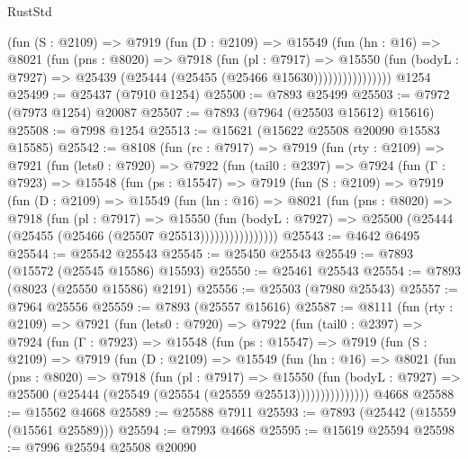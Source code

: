 \begin{lexlean}{RustStd}
\begin{coremodule}
                  (fun (S : @2109) =>
                  @7919
                    (fun (D : @2109) =>
                    @15549
                      (fun (hn : @16) =>
                      @8021
                        (fun (pns : @8020) =>
                        @7918
                          (fun (pl : @7917) =>
                          @15550
                            (fun (bodyL : @7927) =>
                            @25439 (@25444 (@25455 (@25466 @15630))))))))))))))))
    @1254
@25499 := @25437 (@7910 @1254)
@25500 := @7893 @25499
@25503 := @7972 (@7973 @1254) @20087
@25507 := @7893 (@7964 (@25503 @15612) @15616)
@25508 := @7998 @1254
@25513 := @15621 (@15622 @25508 @20090 @15583 @15585)
@25542 := @8108
    (fun (rc : @7917) =>
    @7919
      (fun (rty : @2109) =>
      @7921
        (fun (lets0 : @7920) =>
        @7922
          (fun (tail0 : @2397) =>
          @7924
            (fun (Γ : @7923) =>
            @15548
              (fun (ps : @15547) =>
              @7919
                (fun (S : @2109) =>
                @7919
                  (fun (D : @2109) =>
                  @15549
                    (fun (hn : @16) =>
                    @8021
                      (fun (pns : @8020) =>
                      @7918
                        (fun (pl : @7917) =>
                        @15550
                          (fun (bodyL : @7927) =>
                          @25500 (@25444 (@25455 (@25466 (@25507 @25513))))))))))))))))
@25543 := @4642 @6495
@25544 := @25542 @25543
@25545 := @25450 @25543
@25549 := @7893 (@15572 (@25545 @15586) @15593)
@25550 := @25461 @25543
@25554 := @7893 (@8023 (@25550 @15586) @2191)
@25556 := @25503 (@7980 @25543)
@25557 := @7964 @25556
@25559 := @7893 (@25557 @15616)
@25587 := @8111
    (fun (rty : @2109) =>
    @7921
      (fun (lets0 : @7920) =>
      @7922
        (fun (tail0 : @2397) =>
        @7924
          (fun (Γ : @7923) =>
          @15548
            (fun (ps : @15547) =>
            @7919
              (fun (S : @2109) =>
              @7919
                (fun (D : @2109) =>
                @15549
                  (fun (hn : @16) =>
                  @8021
                    (fun (pns : @8020) =>
                    @7918
                      (fun (pl : @7917) =>
                      @15550
                        (fun (bodyL : @7927) =>
                        @25500 (@25444 (@25549 (@25554 (@25559 @25513)))))))))))))))
    @4668
@25588 := @15562 @4668
@25589 := @25588 @7911
@25593 := @7893 (@25442 (@15559 (@15561 @25589)))
@25594 := @7993 @4668
@25595 := @15619 @25594
@25598 := @7996 @25594 @25508 @20090

\end{coremodule}
\end{lexlean}
